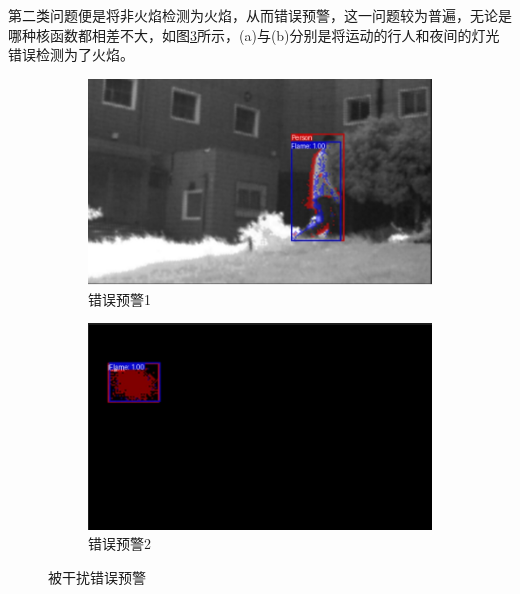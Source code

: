 第二类问题便是将非火焰检测为火焰，从而错误预警，这一问题较为普遍，无论是哪种核函数都相差不大，如图\ref{22}所示，(a)与(b)分别是将运动的行人和夜间的灯光错误检测为了火焰。
\begin{figure}[ht]
    \centering
    \begin{subfigure}{0.49\textwidth}
        \centering
        \includegraphics[width=\textwidth]{figures/jiance4.png}
        \caption{错误预警1}
        \label{22.a}
    \end{subfigure}
    \hfill
    \begin{subfigure}{0.49\textwidth}
        \centering
        \includegraphics[width=\textwidth]{figures/jiance5.png}
        \caption{错误预警2}
        \label{22.b}
    \end{subfigure}
    \caption{被干扰错误预警}
    \label{22}
\end{figure}

